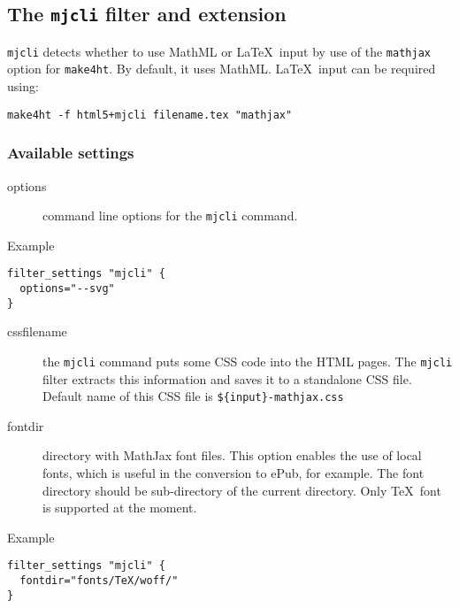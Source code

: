 \hypertarget{mathjaxsettings}{%
\subsection{\texorpdfstring{The \texttt{mjcli} filter and
extension}{The mjcli filter and extension}}\label{mathjaxsettings}}

\texttt{mjcli} detects whether to use MathML or \LaTeX~input by use of
the \texttt{mathjax} option for \texttt{make4ht}. By default, it uses
MathML. \LaTeX~input can be required using:

\begin{verbatim}
make4ht -f html5+mjcli filename.tex "mathjax"
\end{verbatim}

\hypertarget{available-settings}{%
\subsubsection{Available settings}\label{available-settings}}

\begin{description}
\item[options]
command line options for the \texttt{mjcli} command.
\end{description}

Example

\begin{verbatim}
filter_settings "mjcli" {
  options="--svg"
}
\end{verbatim}

\begin{description}
\item[cssfilename]
the \texttt{mjcli} command puts some CSS code into the HTML pages. The
\texttt{mjcli} filter extracts this information and saves it to a
standalone CSS file. Default name of this CSS file is
\texttt{\$\{input\}-mathjax.css}
\item[fontdir]
directory with MathJax font files. This option enables the use of local
fonts, which is useful in the conversion to ePub, for example. The font
directory should be sub-directory of the current directory. Only
\TeX~font is supported at the moment.
\end{description}

Example

\begin{verbatim}
filter_settings "mjcli" {
  fontdir="fonts/TeX/woff/" 
}
\end{verbatim}

